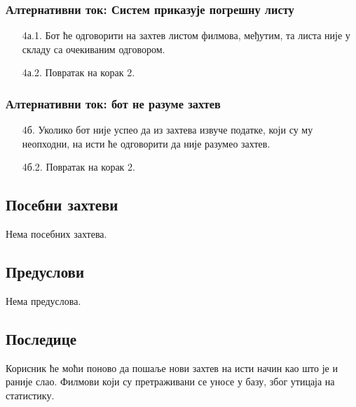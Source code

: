 \documentclass[12pt,a4paper]{article}
\begin{document}
\subsubsection{Алтернативни ток: Систем приказује погрешну листу} 
 \begin{enumerate}
        \item[4а.1.] 
    Бот ће одговорити на захтев листом филмова, међутим, та листа није у складу са очекиваним одговором.
   \item[4а.2.] Повратак на корак 2.
\end{enumerate}

\subsubsection{Алтернативни ток: бот не разуме захтев} 
 \begin{enumerate}
        \item[4б.]  
      Уколико бот није успео да из захтева извуче податке, који су му неопходни, на исти ће одговорити да није разумео захтев.
       \item[4б.2.] Повратак на корак 2.
\end{enumerate}
\subsection{Посебни захтеви}
Нема посебних захтева.
\subsection{Предуслови}
Нема предуслова.
 
 
\subsection{Последице}
Корисник ће моћи поново да пошаље нови захтев на исти начин као што је и раније слао. Филмови који су претраживани се уносе у базу, због утицаја на статистику.
\end{document}
